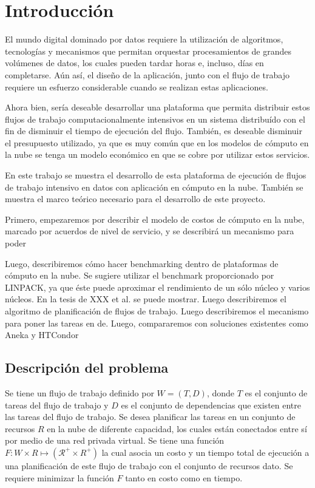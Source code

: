 \chapter{Introducción}

El mundo digital dominado por datos requiere la utilización de algoritmos, tecnologías y mecanismos que permitan orquestar procesamientos de grandes volúmenes de datos, los cuales pueden tardar horas e, incluso, días en completarse. Aún así, el diseño de la aplicación, junto con el flujo de trabajo requiere un esfuerzo considerable cuando se realizan estas aplicaciones.

Ahora bien, sería deseable desarrollar una plataforma que permita distribuir estos flujos de trabajo computacionalmente intensivos en un sistema distribuído con el fin de disminuir el tiempo de ejecución del flujo. También, es deseable disminuir el presupuesto utilizado, ya que es muy común que en los modelos de cómputo en la nube se tenga un modelo económico en que se cobre por utilizar estos servicios.

En este trabajo se muestra el desarrollo de esta plataforma de ejecución de flujos de trabajo intensivo en datos con aplicación en cómputo en la nube. También se muestra el marco teórico necesario para el desarrollo de este proyecto.

Primero, empezaremos por describir el modelo de costos de cómputo en la nube, marcado por acuerdos de nivel de servicio, y se describirá un mecanismo para poder

Luego, describiremos cómo hacer benchmarking dentro de plataformas de cómputo en la nube. Se sugiere utilizar el benchmark proporcionado por LINPACK, ya que éste puede aproximar el rendimiento de un sólo núcleo y varios núcleos. En la tesis de XXX et al. se puede mostrar. Luego describiremos el algoritmo de planificación de flujos de trabajo. Luego describiremos el mecanismo para poner las tareas en de. Luego, compararemos con soluciones existentes como Aneka y HTCondor


\section{Descripción del problema}

Se tiene un flujo de trabajo definido por $W = (T, D)$, donde $T$ es el conjunto de tareas del flujo de trabajo y $D$ es el conjunto de dependencias que existen entre las tareas del flujo de trabajo. Se desea planificar las tareas en un conjunto de recursos $R$ en la nube de diferente capacidad, los cuales están conectados entre sí por medio de una red privada virtual. Se tiene una función $F: W \times R \mapsto (\mathcal{R}^{+} \times {R}^{+}) $ la cual asocia un costo y un tiempo total de ejecución a una planificación de este flujo de trabajo con el conjunto de recursos dato. Se requiere minimizar la función $F$ tanto en costo como en tiempo.